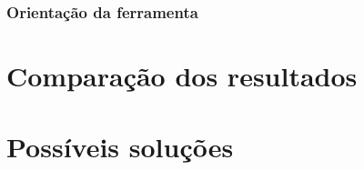 \subsubsection{Orientação da ferramenta}


\section{Comparação dos resultados} \label{sec::comparacao}


\section{Possíveis soluções} \label{sec::solucoes}

